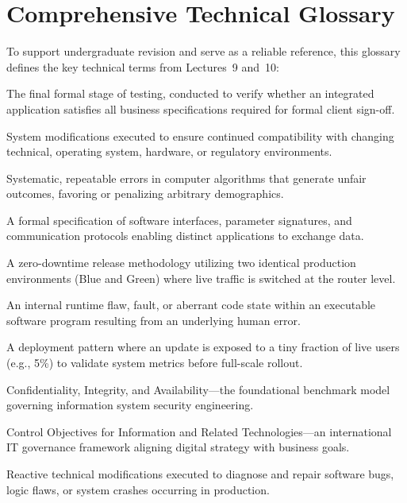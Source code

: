 \documentclass[11pt,a4paper]{article}
\begin{document}
\section[Technical Glossary]{Comprehensive Technical Glossary}
\label{sec:glossary}

To support undergraduate revision and serve as a reliable reference, this glossary defines the key technical terms from Lectures~9 and~10:

\begin{description}[leftmargin=!,labelwidth=4.5cm]
    \item[Acceptance Testing] The final formal stage of testing, conducted to verify whether an integrated application satisfies all business specifications required for formal client sign-off.
    \item[Adaptive Maintenance] System modifications executed to ensure continued compatibility with changing technical, operating system, hardware, or regulatory environments.
    \item[Algorithmic Bias] Systematic, repeatable errors in computer algorithms that generate unfair outcomes, favoring or penalizing arbitrary demographics.
    \item[API (Application Programming Interface)] A formal specification of software interfaces, parameter signatures, and communication protocols enabling distinct applications to exchange data.
    \item[Blue-Green Deployment] A zero-downtime release methodology utilizing two identical production environments (Blue and Green) where live traffic is switched at the router level.
    \item[Bug] An internal runtime flaw, fault, or aberrant code state within an executable software program resulting from an underlying human error.
    \item[Canary Deployment] A deployment pattern where an update is exposed to a tiny fraction of live users (e.g., 5\%) to validate system metrics before full-scale rollout.
    \item[CIA Triad] Confidentiality, Integrity, and Availability---the foundational benchmark model governing information system security engineering.
    \item[COBIT] Control Objectives for Information and Related Technologies---an international IT governance framework aligning digital strategy with business goals.
    \item[Corrective Maintenance] Reactive technical modifications executed to diagnose and repair software bugs, logic flaws, or system crashes occurring in production.

\end{description}
\end{document}
